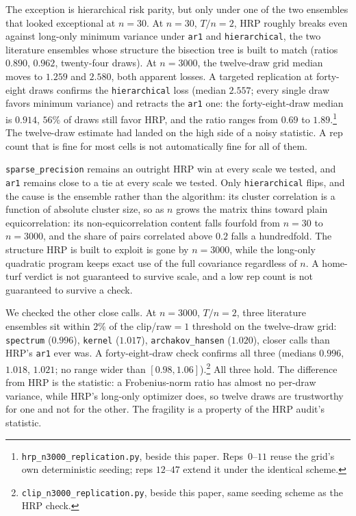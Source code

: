 \documentclass[11pt]{article}
\begin{document}
The exception is hierarchical risk parity, but only under one of the two
ensembles that looked exceptional at $n=30$. At $n=30$, $T/n=2$, HRP
roughly breaks even against long-only minimum variance under
\texttt{ar1} and \texttt{hierarchical}, the two literature ensembles
whose structure the bisection tree is built to match (ratios $0.890$,
$0.962$, twenty-four draws). At $n=3000$, the twelve-draw grid median
moves to $1.259$ and $2.580$, both apparent losses. A targeted
replication at forty-eight draws confirms the \texttt{hierarchical} loss
(median $2.557$; every single draw favors minimum variance) and retracts the
\texttt{ar1} one: the forty-eight-draw median is $0.914$, $56\%$ of
draws still favor HRP, and the ratio ranges from $0.69$ to
$1.89$.\footnote{\texttt{hrp\_n3000\_replication.py}, beside this paper.
Reps~$0$--$11$ reuse the grid's own deterministic seeding; reps
$12$--$47$ extend it under the identical scheme.} The twelve-draw
estimate had landed on the high side of a noisy statistic. A rep count
that is fine for most cells is not automatically fine for all of them.

\texttt{sparse\_precision} remains an outright HRP win at every scale we
tested, and \texttt{ar1} remains close to a tie at every scale we
tested. Only \texttt{hierarchical} flips, and the cause is the
ensemble rather than the algorithm: its cluster correlation is a function
of absolute cluster size, so as $n$ grows the matrix thins toward plain
equicorrelation: its non-equicorrelation content falls fourfold from
$n=30$ to $n=3000$, and the share of pairs correlated above $0.2$ falls a
hundredfold. The structure HRP is built to exploit is gone by $n=3000$,
while the long-only quadratic
program keeps exact use of the full covariance regardless of $n$. A
home-turf verdict is not guaranteed to survive scale, and a low rep count
is not guaranteed to survive a check.

We checked the other close calls. At $n=3000$, $T/n=2$, three
literature ensembles sit within $2\%$ of the clip/raw$=1$ threshold on
the twelve-draw grid: \texttt{spectrum} ($0.996$), \texttt{kernel}
($1.017$), \texttt{archakov\_hansen} ($1.020$), closer calls than HRP's
\texttt{ar1} ever was. A forty-eight-draw check confirms all three
(medians $0.996$, $1.018$, $1.021$; no range wider than $[0.98,
1.06]$).\footnote{\texttt{clip\_n3000\_replication.py}, beside this
paper, same seeding scheme as the HRP check.} All three hold. The
difference from HRP is the statistic: a Frobenius-norm ratio has almost
no per-draw variance, while HRP's long-only optimizer does, so twelve
draws are trustworthy for one and not for the other. The fragility is a
property of the HRP audit's statistic.
\end{document}
